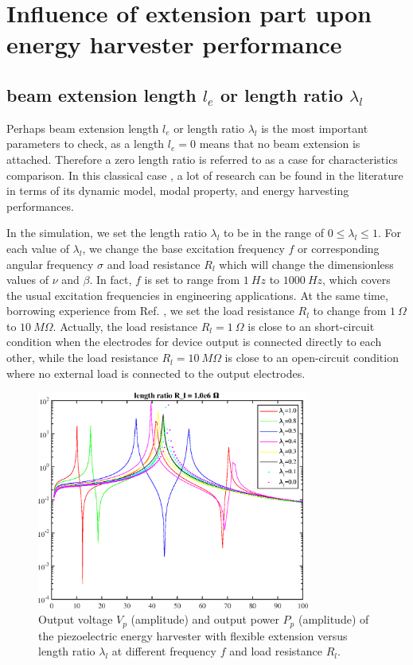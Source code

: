 \documentclass{elsarticle}
\begin{document}
\section{Influence of extension part upon energy harvester performance}

\subsection{beam extension length $l_e$ or length ratio $\lambda_l$}

Perhaps beam extension length $l_e$ or length ratio $\lambda_l$ is the most important parameters to check, as a length $l_e = 0$ means that no beam extension is attached. Therefore a zero length ratio is referred to as a case for characteristics comparison. In this classical case \cite{erturk2009experimentally}, a lot of research can be found in the literature in terms of its dynamic model, modal property, and energy harvesting performances. 

In the simulation, we set the length ratio $\lambda_l$ to be in the range of $0 \leq \lambda_l \leq 1$. For each value of $\lambda_l$, we change the base excitation frequency $f$ or corresponding angular frequency $\sigma$ and load resistance $R_l$ which will change the dimensionless values of $\nu$ and $\beta$. In fact, $f$ is set to range from $1\ Hz$ to $1000\ Hz$, which covers the usual excitation frequencies in engineering applications. At the same time, borrowing experience from Ref. \cite{erturk2009experimentally}, we set the load resistance $R_l$ to change from $1\ \Omega$ to $10\ M\Omega$. Actually, the load resistance $R_l = 1\ \Omega$ is close to an short-circuit condition when the electrodes for device output is connected directly to each other, while the load resistance $R_l = 10\ M\Omega$ is close to an open-circuit condition where no external load is connected to the output electrodes.

\begin{figure}[!htbp]
    \centering
    \includegraphics[width=0.8\textwidth]{./fig_laml_vol_versus_fr_Rl.eps}
    \caption{Output voltage $V_p$ (amplitude) and output power $P_p$ (amplitude) of the piezoelectric energy harvester with flexible extension versus length ratio $\lambda_l$ at different frequency $f$ and load resistance $R_l$. }
    \label{fig:fig_laml_vol_versus_fr_Rl}
\end{figure}
\end{document}
